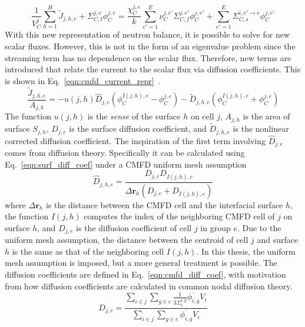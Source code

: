 \begin{equation}
\frac{1}{V_C^j} \sum_{h=1}^H \tilde{J}_{j,h,e} + \Sigma_{C,t}^{j,e} \phi_C^{j,e} = \frac{\chi_C^{j,e}}{k} \sum_{e'=1}^{E} \nu_C^{j, e'} \Sigma_{C,f}^{j,e'} \phi_C^{j,e'} + \sum_{e'=1}^E  \Sigma_{C,s}^{i, e' \rightarrow e} \phi_C^{j,e'}
\label{eqn:transport_partial_current_1}
\end{equation}
With this new representation of neutron balance, it is possible to solve for new scalar fluxes. However, this is not in the form of an eigenvalue problem since the streaming term has no dependence on the scalar flux. Therefore, new terms are introduced that relate the current to the scalar flux via diffusion coefficients. This is shown in Eq.~\ref{eqn:cmfd_current_repr}~\cite{smith1983cmfd}.
\begin{equation}
\frac{\tilde{J}_{j,h,e}}{A_{j,h}} = - u(j,h) \hat{D}_{j,e} \left(\phi_C^{I(j,h),e} - \phi_C^{j,e}\right) - \tilde{D}_{j,h,e} \left(\phi_C^{I(j,h),e} + \phi_C^{j,e}\right)
\label{eqn:cmfd_current_repr}
\end{equation}
The function $u(j,h)$ is the \textit{sense} of the surface $h$ on cell $j$, $A_{j,h}$ is the area of surface $S_{j,h}$, $\hat{D}_{j,e}$ is the surface diffusion coefficient, and $\tilde{D}_{j,h,e}$ is the nonlinear corrected diffusion coefficient. The inspiration of the first term involving $\hat{D}_{j,e}$ comes from diffusion theory. Specifically it can be calculated using Eq.~\ref{eqn:surf_diff_coef} under a \ac{CMFD} uniform mesh assumption
\begin{equation}
\hat{D}_{j,h,e} = \frac{D_{j,e} D_{I(j,h),e}}{\Delta \mathbf{r}_h \left( D_{j,e} + D_{I(j,h),e} \right)}
\label{eqn:surf_diff_coef}
\end{equation}
where $\Delta \mathbf{r}_h$ is the distance between the \ac{CMFD} cell and the interfacial surface $h$, the function $I(j,h)$ computes the index of the neighboring \ac{CMFD} cell of $j$ on surface $h$, and $D_{j,e}$ is the diffusion coefficient of cell $j$ in group $e$. Due to the uniform mesh assumption, the distance between the centroid of cell $j$ and surface $h$ is the same as that of the neighboring cell $I(j,h)$. In this thesis, the uniform mesh assumption is imposed, but a more general treatment is possible. The diffusion coefficients are defined in Eq.~\ref{eqn:cmfd_diff_coef}, with motivation from how diffusion coefficients are calculated in common nodal diffusion theory.
\begin{equation}
D_{j,e} = \frac{\sum_{i \in j} \sum_{g \in e} \frac{1}{3\Sigma_{t}^{i, g}} \overline{\phi_{i,g}} V_i}{\sum_{i \in j} \sum_{g \in e} \overline{\phi_{i,g}} V_i}
\label{eqn:cmfd_diff_coef}
\end{equation}
